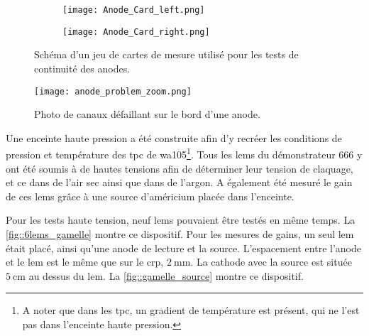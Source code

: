             \begin{figure}
                \begin{minipage}{0.4\textwidth}
                    \begin{subfigure}{0.1\textwidth}
                        \texttt{[image: Anode\_Card\_left.png]}
                    \end{subfigure}
                    \hfill
                    \begin{subfigure}{0.1\textwidth}
                        \texttt{[image: Anode\_Card\_right.png]}
                    \end{subfigure}
                    \caption[Schéma d'un jeu de cartes de mesure utilisé pour les tests de continuité des anodes.]{Schéma d'un jeu de cartes de mesure utilisé pour les tests de continuité des anodes.}
                    \label{fig::anode_card_both}
                \end{minipage}
                    \hfill
                \begin{minipage}{0.4\textwidth}
                    \texttt{[image: anode\_problem\_zoom.png]}
                    \caption[Photo de canaux défaillant sur le bord d'une anode.]{Photo de canaux défaillant sur le bord d'une anode.}
                    \label{fig::anode_test_probleme}
                \end{minipage}
            \end{figure}
            Une enceinte haute pression a été construite afin d'y recréer les conditions de pression et température des \gls{tpc} de \gls{wa105}\footnote{A noter que dans les \gls{tpc}, un gradient de température est présent, qui ne l'est pas dans l'enceinte haute pression.}. Tous les \glspl{lem} du démonstrateur 666 y ont été soumis à de hautes tensions afin de déterminer leur tension de claquage, et ce dans de l'air sec ainsi que dans de l'argon. A également été mesuré le gain de ces \glspl{lem} grâce à une source d'américium placée dans l'enceinte.
            
            Pour les tests haute tension, neuf \glspl{lem} pouvaient être testés en même temps. La \autoref{fig::6lems_gamelle} montre  ce dispositif. Pour les mesures de gains, un seul \gls{lem} était placé, ainsi qu'une anode de lecture et la source. L'espacement entre l'anode et le \gls{lem} est le même que sur le \gls{crp}, $\SI{2}{\milli\meter}$. La cathode avec la source est située $\SI{5}{\centi\meter}$ au dessus du \gls{lem}. La \autoref{fig::gamelle_source} montre ce dispositif.
        
